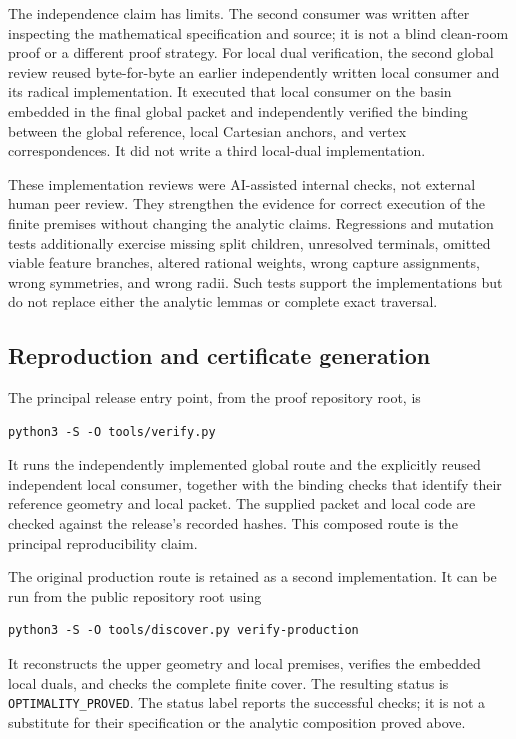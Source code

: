 \documentclass[11pt]{article}
\begin{document}
The independence claim has limits. The second consumer was written after inspecting the mathematical specification and source; it is not a blind clean-room proof or a different proof strategy. For local dual verification, the second global review reused byte-for-byte an earlier independently written local consumer and its radical implementation. It executed that local consumer on the basin embedded in the final global packet and independently verified the binding between the global reference, local Cartesian anchors, and vertex correspondences. It did not write a third local-dual implementation.

These implementation reviews were AI-assisted internal checks, not external human peer review. They strengthen the evidence for correct execution of the finite premises without changing the analytic claims. Regressions and mutation tests additionally exercise missing split children, unresolved terminals, omitted viable feature branches, altered rational weights, wrong capture assignments, wrong symmetries, and wrong radii. Such tests support the implementations but do not replace either the analytic lemmas or complete exact traversal.

\subsection{Reproduction and certificate generation}

The principal release entry point, from the proof repository root, is
\begin{verbatim}
python3 -S -O tools/verify.py
\end{verbatim}
It runs the independently implemented global route and the explicitly reused independent local consumer, together with the binding checks that identify their reference geometry and local packet. The supplied packet and local code are checked against the release's recorded hashes. This composed route is the principal reproducibility claim.

The original production route is retained as a second implementation. It can be run from the public repository root using
\begin{verbatim}
python3 -S -O tools/discover.py verify-production
\end{verbatim}
It reconstructs the upper geometry and local premises, verifies the embedded local duals, and checks the complete finite cover. The resulting status is \texttt{OPTIMALITY\_PROVED}. The status label reports the successful checks; it is not a substitute for their specification or the analytic composition proved above.
\end{document}
